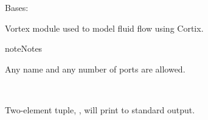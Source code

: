 \documentclass[letterpaper,10pt,openany,oneside,english]{sphinxmanual}
\begin{document}
\begin{fulllineitems}
\label{\detokenize{examples_rst/vortex:vortex.Vortex}}
Bases: 

Vortex module used to model fluid flow using Cortix.

\begin{sphinxadmonition}{note}{Notes}

Any  name and any number of ports are allowed.
\end{sphinxadmonition}

\begin{fulllineitems}
\label{\detokenize{examples_rst/vortex:vortex.Vortex.__init__}}~

\begin{fulllineitems}
\label{\detokenize{examples_rst/vortex:vortex.Vortex.initial_time}}

\end{fulllineitems}


\begin{fulllineitems}
\label{\detokenize{examples_rst/vortex:vortex.Vortex.end_time}}

\end{fulllineitems}


\begin{fulllineitems}
\label{\detokenize{examples_rst/vortex:vortex.Vortex.time_step}}

\end{fulllineitems}


\begin{fulllineitems}
\label{\detokenize{examples_rst/vortex:vortex.Vortex.show_time}}
 \textendash{} Two-element tuple, ,  will print to standard
output.


\end{fulllineitems}
\end{fulllineitems}
\end{fulllineitems}
\end{document}
